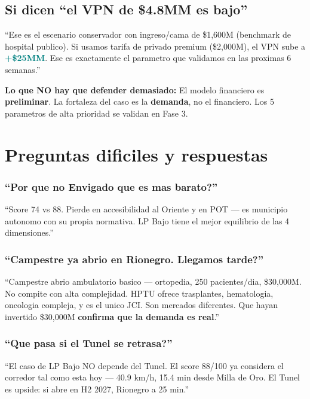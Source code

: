 \documentclass[11pt, a4paper]{article}
\newcommand{\hl}[1]{\textcolor{teal}{\textbf{#1}}}
\begin{document}
\subsection{Si dicen ``el VPN de \$4.8MM es bajo''}

\begin{tip}
``Ese es el escenario conservador con ingreso/cama de \$1,600M (benchmark de hospital publico). Si usamos tarifa de privado premium (\$2,000M), el VPN sube a \hl{+\$25MM}. Ese es exactamente el parametro que validamos en las proximas 6 semanas.''
\end{tip}

\begin{alerta}
\textbf{Lo que NO hay que defender demasiado:} El modelo financiero es \textbf{preliminar}. La fortaleza del caso es la \textbf{demanda}, no el financiero. Los 5 parametros de alta prioridad se validan en Fase 3.
\end{alerta}


\section{Preguntas dificiles y respuestas}

\subsubsection{``Por que no Envigado que es mas barato?''}
\begin{tip}
``Score 74 vs 88. Pierde en accesibilidad al Oriente y en POT --- es municipio autonomo con su propia normativa. LP Bajo tiene el mejor equilibrio de las 4 dimensiones.''
\end{tip}

\subsubsection{``Campestre ya abrio en Rionegro. Llegamos tarde?''}
\begin{tip}
``Campestre abrio ambulatorio basico --- ortopedia, 250 pacientes/dia, \$30,000M. No compite con alta complejidad. HPTU ofrece trasplantes, hematologia, oncologia compleja, y es el unico JCI. Son mercados diferentes. Que hayan invertido \$30,000M \textbf{confirma que la demanda es real}.''
\end{tip}

\subsubsection{``Que pasa si el Tunel se retrasa?''}
\begin{tip}
``El caso de LP Bajo NO depende del Tunel. El score 88/100 ya considera el corredor tal como esta hoy --- 40.9 km/h, 15.4 min desde Milla de Oro. El Tunel es upside: si abre en H2 2027, Rionegro a 25 min.''
\end{tip}
\end{document}
